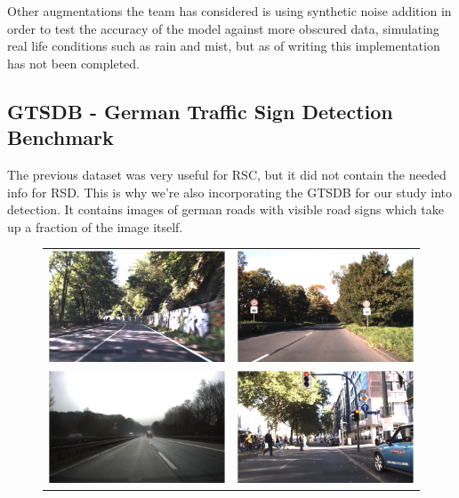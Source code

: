 \documentclass[12pt, landscape]{article}
\begin{document}
\begin{multicols}{3}
Other augmentations the team has considered is using synthetic noise addition in
order to test the accuracy of the model against more obscured data, simulating
real life conditions such as rain and mist, but as of writing this
implementation has not been completed.


\subsection{GTSDB - German Traffic Sign Detection Benchmark}
The previous dataset was very useful for RSC, but it did not contain the needed
info for RSD. This is why we're also incorporating the GTSDB for our study into
detection. It contains images of german roads with visible road signs which take
up a fraction of the image itself.
\begin{figure}[H]
    \centering
    \begin{tabular}{cc}
    \includegraphics[scale=0.5]{example1.png}&\includegraphics[scale=0.5]{example2.png}\\
    \includegraphics[scale=0.5]{example4.png}&\includegraphics[scale=0.5]{example3.png}\\

\end{tabular}
\end{figure}
\end{multicols}
\end{document}
